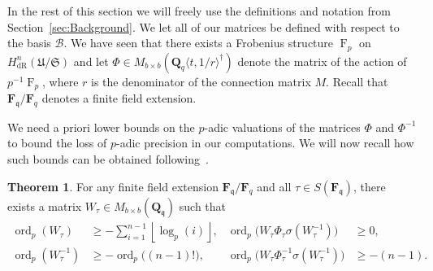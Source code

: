 \documentclass[a4paper,11pt]{article}
\numberwithin{equation}{section}
\providecommand{\floor}[1]{\left\lfloor#1\right\rfloor}   %
\newcommand{\QQ}{\mathbf{Q}} %
\newcommand{\FF}{\mathbf{F}} %
\DeclareMathOperator{\ord}{ord}          %
\DeclareMathOperator{\Frob}{F}           %
\providecommand{\HdR}{H_{\text{dR}}}    %
\providecommand{\cB}{\mathcal{B}} %
\theoremstyle{definition}
\newtheorem{thm}{Theorem}[section]
\begin{document}
In the rest of this section we will freely use the definitions and notation 
from Section~\ref{sec:Background}. We let all of our matrices be defined with 
respect to the basis $\cB$. We have seen that there exists a Frobenius 
structure $\Frob_p$ on $\HdR^n(\mathfrak{U}/\mathfrak{S})$ and let 
$\Phi \in M_{b \times b}(\QQ_q \langle t, 1/r \rangle^{\dag})$ 
denote the matrix of the action of $p^{-1}\Frob_p$, where $r$ is the 
denominator of the connection matrix $M$. Recall that 
$\FF_{\mathfrak{q}}/\FF_q$ 
denotes a finite field extension. 

We need a priori lower bounds on the $p$-adic valuations of the matrices 
$\Phi$ and $\Phi^{-1}$ to bound the loss of $p$-adic precision in our 
computations. We will now recall how such bounds can be obtained 
following~\citep{AbbottKedlayaRoe2006}.

\begin{thm} \label{thm:deltabound}
For any finite field extension $\FF_{\mathfrak{q}}/\FF_q$ and
all $\tau \in S(\FF_{\mathfrak{q}})$, 
there exists a matrix $W_{\tau} \in M_{b \times b}(\QQ_{\mathfrak{q}})$ such that 
\begin{align*}
\ord_p(W_{\tau}) &\geq -\sum_{i=1}^{n-1} \floor{\log_p(i)},
&\ord_p\bigl(W_{\tau} \Phi_{\tau} \sigma(W_{\tau}^{-1})\bigr) &\geq  0, \\
\ord_p(W_{\tau}^{-1}) &\geq -\ord_p \bigl((n-1)! \bigr),
&\ord_p\bigl(W_{\tau} \Phi_{\tau}^{-1} \sigma(W_{\tau}^{-1})\bigr) &\geq  -(n-1).
\end{align*}
\end{thm}
\end{document}
